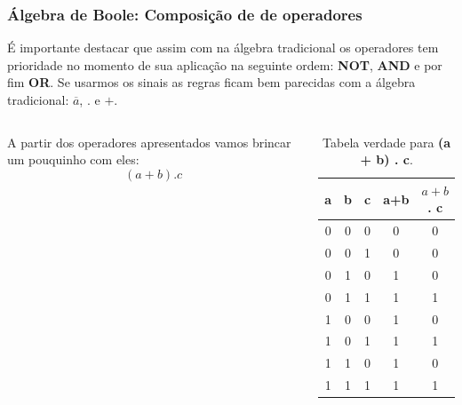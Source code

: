 \begin{frame}
	\frametitle{Álgebra de Boole: Composição de de operadores}
	\par É importante destacar que assim com na álgebra tradicional os operadores tem prioridade no momento de sua aplicação na seguinte ordem: \textbf{NOT}, \textbf{AND} e por fim \textbf{OR}. Se usarmos os sinais as regras ficam bem parecidas com a álgebra tradicional: $\overline{a}$, $.$ e $+$.\newline
	
	\begin{columns}
			\par A partir dos operadores apresentados vamos brincar um pouquinho com eles:
			\begin{equation}
				(a + b) . c
			\end{equation}
			\begin{table}[h!]
				\centering
				\begin{tabular}{|c|c|c|c|c|}
					\hline
					a & b & c & a+b & \(a + b\) . c\\ \hline
					0 & 0 & 0 & 0 & 0 \\ \hline
					0 & 0 & 1 & 0 & 0 \\ \hline
					0 & 1 & 0 & 1 & 0 \\ \hline
					0 & 1 & 1 & 1 & 1 \\ \hline
					1 & 0 & 0 & 1 & 0 \\ \hline
					1 & 0 & 1 & 1 & 1 \\ \hline
					1 & 1 & 0 & 1 & 0 \\ \hline
					1 & 1 & 1 & 1 & 1 \\ \hline
				\end{tabular}
				\caption{Tabela verdade para \textbf{(a + b) . c}.}
				\label{tab:tabelaVerdadeComposta01}
			\end{table}
	\end{columns}
\end{frame}


